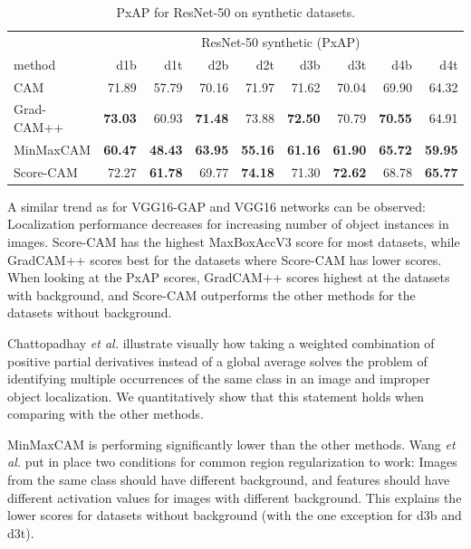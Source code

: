 \begin{table}[ht]
\centering
\begin{tabular}{lrrrrrrrr}
\toprule
 & \multicolumn{8}{c}{ResNet-50 synthetic (PxAP)} \\
method & d1b & d1t & d2b & d2t & d3b & d3t & d4b & d4t \\
\cmidrule(lr){1-1} \cmidrule(lr){2-9} 
CAM & 71.89 & 57.79 & 70.16 & 71.97 & 71.62 & 70.04 & 69.90 & 64.32 \\
Grad-CAM++ & \color{teal} \bfseries 73.03 & 60.93 & \color{teal} \bfseries 71.48 & 73.88 & \color{teal} \bfseries 72.50 & 70.79 & \color{teal} \bfseries 70.55 & 64.91 \\
MinMaxCAM & \color{purple} \bfseries 60.47 & \color{purple} \bfseries 48.43 & \color{purple} \bfseries 63.95 & \color{purple} \bfseries 55.16 & \color{purple} \bfseries 61.16 & \color{purple} \bfseries 61.90 & \color{purple} \bfseries 65.72 & \color{purple} \bfseries 59.95 \\
Score-CAM & 72.27 & \color{teal} \bfseries 61.78 & 69.77 & \color{teal} \bfseries 74.18 & 71.30 & \color{teal} \bfseries 72.62 & 68.78 & \color{teal} \bfseries 65.77 \\
\bottomrule
\end{tabular}
\caption[PxAP for ResNet-50 on synthetic datasets]{PxAP for ResNet-50 on synthetic datasets.}
\label{tab:pxap_resnet50_synthetic}
\end{table}

A similar trend as for VGG16-GAP and VGG16 networks can be observed: Localization performance decreases for increasing number of object instances in images. Score-CAM has the highest MaxBoxAccV3 score for most datasets, while GradCAM++ scores best for the datasets where Score-CAM has lower scores. When looking at the PxAP scores, GradCAM++ scores highest at the datasets with background, and Score-CAM outperforms the other methods for the datasets without background.

Chattopadhay \textit{et al.} \cite{chattopadhyay2017grad} illustrate visually how taking a weighted combination of positive partial derivatives instead of a global average solves the problem of identifying multiple occurrences of the same class in an image and improper object localization. We quantitatively show that this statement holds when comparing with the other methods.

MinMaxCAM is performing significantly lower than the other methods. Wang \textit{et al.} \cite{wang2021minmaxcam} put in place two conditions for common region regularization to work: Images from the same class should have different background, and features should have different activation values for images with different background. This explains the lower scores for datasets without background (with the one exception for d3b and d3t).

